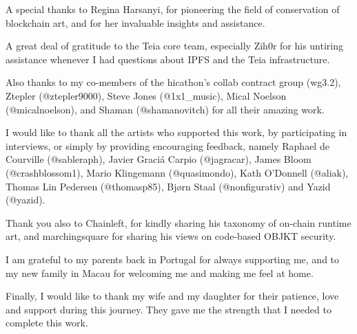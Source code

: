 A special thanks to Regina Harsanyi, for pioneering the field of conservation of blockchain art, and for her invaluable insights and assistance.

A great deal of gratitude to the Teia core team, especially Zih0r for his untiring assistance whenever I had questions about IPFS and the Teia infrastructure.

Also thanks to my co-members of the hicathon's collab contract group (wg3.2), Ztepler (@ztepler9000), Steve Jones (@1x1\_music), Mical Noelson (@micalnoelson), and Shaman (@shamanovitch) for all their amazing work.

I would like to thank all the artists who supported this work, by participating in interviews, or simply by providing encouraging feedback, namely Raphael de Courville (@sableraph), Javier Graciá Carpio (@jagracar), James Bloom (@crashblossom1), Mario Klingemann (@quasimondo), Kath O'Donnell (@aliak), Thomas Lin Pedersen (@thomasp85), Bjørn Staal (@nonfigurativ) and Yazid (@yazid).

Thank you also to Chainleft, for kindly sharing his taxonomy of on-chain runtime art, and marchingsquare for sharing his views on code-based OBJKT security.

I am grateful to my parents back in Portugal for always supporting me, and to my new family in Macau for welcoming me and making me feel at home.

Finally, I would like to thank my wife and my daughter for their patience, love and support during this journey. They gave me the strength that I needed to complete this work.


